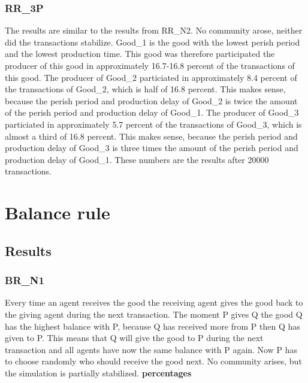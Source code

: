 \documentclass[twoside,openright]{uva-bachelor-thesis}
\begin{document}
\subsubsection{RR\_3P}
The results are similar to the results from RR\_N2. No community arose, neither did the transactions stabilize. Good\_1 is the good with the lowest perish period and the lowest production time. This good was therefore participated the producer of this good in approximately 16.7-16.8 percent of the transactions of this good. The producer of Good\_2 particiated in approximately 8.4 percent of the transactions of Good\_2, which is half of 16.8 percent. This makes sense, because the perish period and production delay of Good\_2 is twice the amount of the perish period and production delay of Good\_1. The producer of Good\_3 particiated in approximately 5.7 percent of the transactions of Good\_3, which is almost a third of 16.8 percent. This makes sense, because the perish period and production delay of Good\_3 is three times the amount of the perish period and production delay of Good\_1. 
These numbers are the results after 20000 transactions.

\section{Balance rule}

\subsection{Results}

\subsubsection{BR\_N1}
Every time an agent receives the good the receiving agent gives the good back to the giving agent during the next transaction. The moment P gives Q the good Q has the highest balance with P, because Q has received more from P then Q has given to P. This means that Q will give the good to P during the next transaction and all agents have now the same balance with P again. Now P has to choose randomly who should receive the good next. No community arises, but the simulation is partially stabilized. \textbf{percentages}
\end{document}
